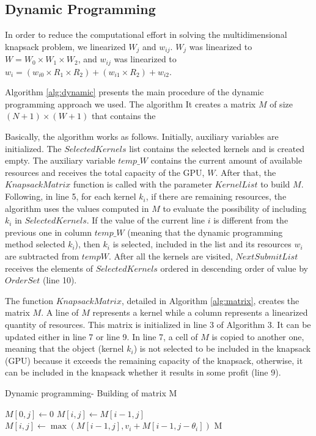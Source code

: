 \subsection{Dynamic Programming} 

In order to reduce the computational effort in solving the multidimensional knapsack problem, we linearized $W_j$ and $w_{ij}$. $W_j$ was linearized to $W = W_0 \times W_1 \times W_2$, and $w_{ij}$ was linearized to $w_i = (w_{i0} \times R_1 \times R_2) + (w_{i1} \times R_2) + w_{i2}$.

Algorithm \ref{alg:dynamic} presents the main procedure of the dynamic programming approach we used. The algorithm It creates a matrix $M$ of size $(N+1)\times (W+1)$ that contains the 

Basically, the algorithm works as follows. Initially, auxiliary variables are initialized. The $SelectedKernels$ list  contains the selected kernels and is created empty. The auxiliary variable $temp\_W$ contains the current amount of available resources and receives the total capacity of the GPU, $W$.  After that, the  $KnapsackMatrix$ function is called with the parameter $KernelList$ to build $M$. Following, in line 5, for each kernel $k_i$, if there are remaining resources, the algorithm uses the values computed in $M$ to evaluate the possibility of including  $k_i$ in  $SelectedKernels$. If the value of the current line $i$ is different from the previous one in column $temp\_W$ (meaning that the dynamic programming method selected $k_i$), then $k_i$ is selected, included in the list and its resources $w_i$ are subtracted from $tempW$. 
After all the kernels are visited, $NextSubmitList$ receives the elements of  $SelectedKernels$  ordered in descending order of value by $OrderSet$ (line 10).



The function $KnapsackMatrix$, detailed in Algorithm \ref{alg:matrix},  creates the matrix $M$.  A line of $M$ represents a kernel  while a column  represents a linearized  quantity of resources. This matrix is initialized in line 3 of Algorithm 3. It can be updated either in line 7  or line 9. In line 7,  a  cell of $M$ is copied to another one,   meaning that the object  (kernel $k_i$) is not selected to be included in  the knapsack (GPU) because it exceeds the remaining capacity of the knapsack, otherwise, it can be  included in the knapsack whether it results in some profit (line 9).

\begin{algorithm}[htb]
\caption{Dynamic programming- Building of matrix M}
\label{alg:matrix}
\footnotesize{
\begin{algorithmic}[1]
 \State $M[0, j] \gets 0$
\EndFor
{}
   \State $M[i,j] \gets M[i-1,j]$
  \Else
   \State $M[i,j] \gets \max(M[i-1,j],v_i + M[i-1,j-\theta_i])$
  \EndIf
 \EndFor
\EndFor
\State \Return M
\EndFunction
\end{algorithmic}
}
\end{algorithm}
